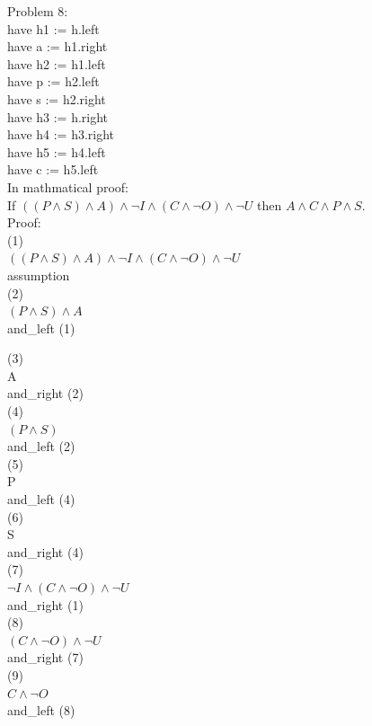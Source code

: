 \documentclass{article}
\theoremstyle{theorem}
\theoremstyle{definition}
\theoremstyle{remark}
\begin{document}
Problem 8:\\
have h1 := h.left \\
have a := h1.right\\
have h2 := h1.left\\
have p := h2.left\\
have s := h2.right\\
have h3 := h.right\\
have h4 := h3.right\\
have h5 := h4.left\\
have c := h5.left\\

In mathmatical proof:\\
If $((P \land S) \land A) \land ¬I \land (C \land ¬O) \land ¬U$ then $A \land C \land P \land S$. \\
Proof:\\
(1)\\
$((P \land S) \land A) \land ¬I \land (C \land ¬O) \land ¬U$\\
assumption\\

(2)\\
$(P \land S) \land A$\\
and\_left (1)

(3)\\
A\\
and\_right (2)\\

(4)\\
$(P \land S)$\\
and\_left (2)\\

(5)\\
P\\
and\_left (4)\\

(6)\\
S\\
and\_right (4)\\

(7)\\
$¬I \land (C \land ¬O) \land ¬U$\\
and\_right (1)\\

(8)\\
$(C \land ¬O) \land ¬U$\\
and\_right (7)\\

(9)\\
$C \land ¬O$\\
and\_left (8)\\
\end{document}
